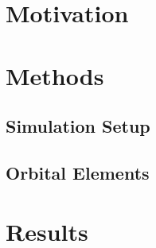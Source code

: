 \documentclass[useAMS,usenatbib]{mn2e}
\begin{document}
\section{Motivation}

\section{Methods}
 
\subsection{Simulation Setup}

\subsection{Orbital Elements}

\section{Results}
\end{document}
